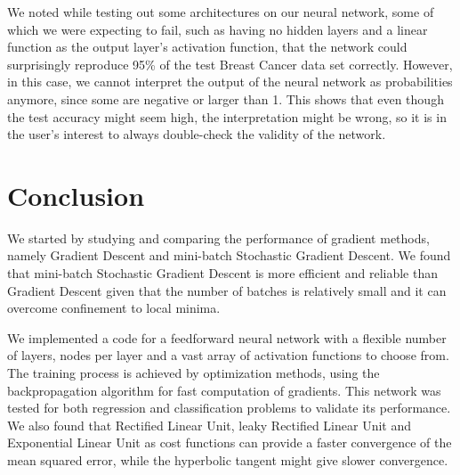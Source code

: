 \documentclass[aps,reprint,superscriptaddress,nofootinbib]{revtex4-2}
\begin{document}
We noted while testing out some architectures on our neural network, some of which we were expecting to fail, such as having no hidden layers and a linear function as the output layer's activation function, that the network could surprisingly reproduce 95\% of the test Breast Cancer data set correctly. However, in this case, we cannot interpret the output of the neural network as probabilities anymore, since some are negative or larger than 1. This shows that even though the test accuracy might seem high, the interpretation might be wrong, so it is in the user's interest to always double-check the validity of the network.

\section*{Conclusion}

We started by studying and comparing the performance of gradient methods, namely Gradient Descent and mini-batch Stochastic Gradient Descent. We found that mini-batch Stochastic Gradient Descent is more efficient and reliable than Gradient Descent given that the number of batches is relatively small and it can overcome confinement to local minima.

We implemented a code for a feedforward neural network  with a flexible number of layers, nodes per layer and a vast array of activation functions to choose from. The training process is achieved by optimization methods, using the backpropagation algorithm for fast computation of gradients. This network was tested for both regression and classification problems to validate its performance. We also found that Rectified Linear Unit, leaky Rectified Linear Unit and Exponential Linear Unit as cost functions can provide a faster convergence of the mean squared error, while the hyperbolic tangent might give slower convergence.
\end{document}
